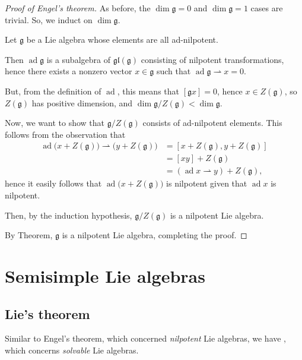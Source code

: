 \documentclass{article}
\newcommand{\lb}[1]{\ensuremath{\left[{#1}\right]}}
\DeclareMathOperator{\ad}{ad}
\newcommand{\frkg}{{\ensuremath{\mathfrak{g}}}}
\newcommand{\glalg}{\ensuremath{\mathfrak{gl}}}
\begin{document}
\begin{proof}[Proof of Engel's theorem]
    As before, the $\dim \frkg = 0$ and $\dim \frkg = 1$ cases are trivial.
    So, we induct on $\dim \frkg$.

    Let $\frkg$ be a Lie algebra whose elements are all ad-nilpotent.

    Then $\ad \frkg$ is a subalgebra of $\glalg(\frkg)$ consisting of nilpotent transformations, hence there exists a nonzero vector $x \in \frkg$ such that $\ad \frkg \rightharpoonup x = 0$.

    But, from the definition of $\ad$, this means that $\lb{\frkg x} = 0$, hence $x \in Z(\frkg)$, so $Z(\frkg)$ has positive dimension, and $\dim \frkg / Z(\frkg) < \dim \frkg$.

    Now, we want to show that $\frkg/Z(\frkg)$ consists of ad-nilpotent elements.
    This follows from the observation that
    \begin{align*}
        \ad \Big(x + Z(\frkg)\Big) \rightharpoonup \Big(y + Z(\frkg)\Big)
        &= 
        \lb{x + Z(\frkg), y + Z(\frkg)} 
        \\
        &= \lb{xy} + Z(\frkg) 
        \\
        &= (\ad x \rightharpoonup y) + Z(\frkg),
    \end{align*}
    hence it easily follows that $\ad \Big(x + Z(\frkg)\Big)$ is nilpotent given that $\ad x$ is nilpotent.
    
    Then, by the induction hypothesis, $\frkg/Z(\frkg)$ is a nilpotent Lie algebra.

    By Theorem, $\frkg$ is a nilpotent Lie algebra, completing the proof.
\end{proof}

\begin{corollary}
\end{corollary}

\section{Semisimple Lie algebras}

\subsection{Lie's theorem}

Similar to Engel's theorem, which concerned \textit{nilpotent} Lie algebras, we have , which concerns \textit{solvable} Lie algebras.
\end{document}
